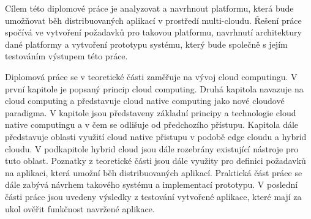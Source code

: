 	\par
	    Cílem této diplomové práce je analyzovat a navrhnout platformu, která bude umožňovat běh distribuovaných aplikací v prostředí multi-cloudu. Řešení práce spočívá ve vytvoření požadavků pro takovou platformu, navrhnutí architektury dané platformy a vytvoření prototypu systému, který bude společně s jejím testováním výstupem této práce. 
	    \par
	        Diplomová práce se v teoretické části zaměřuje na vývoj cloud computingu. V první kapitole je popsaný princip cloud computing. Druhá kapitola navazuje na cloud computing a představuje cloud native computing jako nové cloudové paradigma. V kapitole jsou představeny základní principy a technologie cloud native computingu a v čem se odlišuje od předchozího přístupu. Kapitola dále představuje oblasti využití cloud native přistupu v podobě edge cloudu a hybrid cloudu. V podkapitole hybrid cloud jsou dále rozebrány existující nástroje pro tuto oblast. Poznatky z teoretické části jsou dále využity pro definici požadavků na aplikaci, která umožní běh distribuovaných aplikací. Praktická část práce se dále zabývá návrhem takového systému a implementací prototypu. V poslední části práce jsou uvedeny výsledky z testování vytvořené aplikace, které mají za ukol ověřit funkčnost navržené aplikace. 

